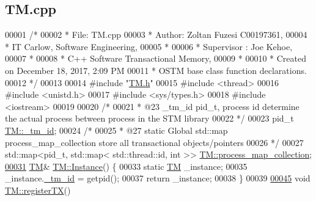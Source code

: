 \hypertarget{_t_m_8cpp_source}{}\subsection{T\+M.\+cpp}

\begin{DoxyCode}
00001 \textcolor{comment}{/* }
00002 \textcolor{comment}{ * File:   TM.cpp}
00003 \textcolor{comment}{ * Author: Zoltan Fuzesi C00197361, }
00004 \textcolor{comment}{ * IT Carlow, Software Engineering, }
00005 \textcolor{comment}{ *}
00006 \textcolor{comment}{ * Supervisor : Joe Kehoe, }
00007 \textcolor{comment}{ *}
00008 \textcolor{comment}{ * C++ Software Transactional Memory, }
00009 \textcolor{comment}{ * }
00010 \textcolor{comment}{ * Created on December 18, 2017, 2:09 PM}
00011 \textcolor{comment}{ * OSTM base class function declarations.}
00012 \textcolor{comment}{ */}
00013 
00014 \textcolor{preprocessor}{#include "\hyperlink{_t_m_8h}{TM.h}"}
00015 \textcolor{preprocessor}{#include <thread>}
00016 \textcolor{preprocessor}{#include <unistd.h>}
00017 \textcolor{preprocessor}{#include <sys/types.h>}
00018 \textcolor{preprocessor}{#include <iostream>}
00019 
00020 \textcolor{comment}{/*}
00021 \textcolor{comment}{ * @23 \_tm\_id pid\_t, process id determine the actual process between process in the STM library}
00022 \textcolor{comment}{ */}
00023 pid\_t \hyperlink{class_t_m_a9d49d0ddef82337e54b684c9e1e8ad21_a9d49d0ddef82337e54b684c9e1e8ad21}{TM::\_tm\_id};
00024 \textcolor{comment}{/*}
00025 \textcolor{comment}{ * @27 static Global std::map process\_map\_collection store all transactional objects/pointers}
00026 \textcolor{comment}{ */}
00027 std::map<pid\_t, std::map< std::thread::id, int >> \hyperlink{class_t_m_a6d417b18213968da2a70a914e80d639b_a6d417b18213968da2a70a914e80d639b}{TM::process\_map\_collection};
\hypertarget{_t_m_8cpp_source.tex_l00031}{}\hyperlink{class_t_m_a7ce5f35e0dae76df4fe116cf905bbe60_a7ce5f35e0dae76df4fe116cf905bbe60}{00031} \hyperlink{class_t_m}{TM}& \hyperlink{class_t_m_a7ce5f35e0dae76df4fe116cf905bbe60_a7ce5f35e0dae76df4fe116cf905bbe60}{TM::Instance}() \{
00033     \textcolor{keyword}{static} \hyperlink{class_t_m}{TM} \_instance;
00035     \_instance.\hyperlink{class_t_m_a9d49d0ddef82337e54b684c9e1e8ad21_a9d49d0ddef82337e54b684c9e1e8ad21}{\_tm\_id} = getpid();
00037     \textcolor{keywordflow}{return} \_instance;
00038 \}
00039 
\hypertarget{_t_m_8cpp_source.tex_l00045}{}\hyperlink{class_t_m_a26ea481c24d9aa3aebd6dafb7253376e_a26ea481c24d9aa3aebd6dafb7253376e}{00045} \textcolor{keywordtype}{void} \hyperlink{class_t_m_a26ea481c24d9aa3aebd6dafb7253376e_a26ea481c24d9aa3aebd6dafb7253376e}{TM::registerTX}()

\end{DoxyCode}
